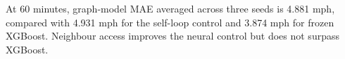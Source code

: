  At 60 minutes, graph-model MAE averaged across three seeds is 4.881 mph, compared with 4.931 mph for the self-loop control and 3.874 mph for frozen XGBoost. Neighbour access improves the neural control but does not surpass XGBoost.

